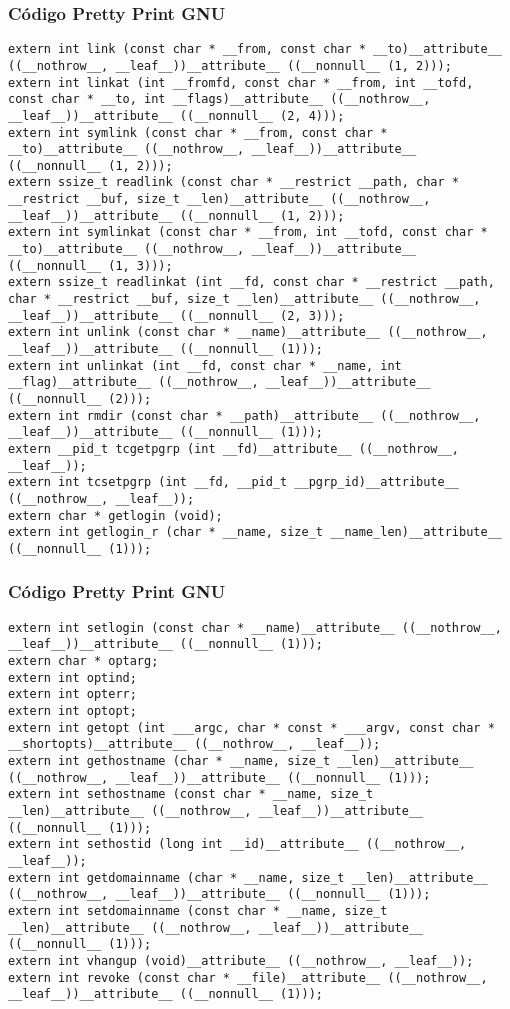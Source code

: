 \documentclass{beamer}
\begin{document}
\begin{frame}[fragile]
\frametitle{C\'odigo Pretty Print GNU}
\begin{verbatim}
extern int link (const char * __from, const char * __to)__attribute__ ((__nothrow__, __leaf__))__attribute__ ((__nonnull__ (1, 2)));
extern int linkat (int __fromfd, const char * __from, int __tofd, const char * __to, int __flags)__attribute__ ((__nothrow__, __leaf__))__attribute__ ((__nonnull__ (2, 4)));
extern int symlink (const char * __from, const char * __to)__attribute__ ((__nothrow__, __leaf__))__attribute__ ((__nonnull__ (1, 2)));
extern ssize_t readlink (const char * __restrict __path, char * __restrict __buf, size_t __len)__attribute__ ((__nothrow__, __leaf__))__attribute__ ((__nonnull__ (1, 2)));
extern int symlinkat (const char * __from, int __tofd, const char * __to)__attribute__ ((__nothrow__, __leaf__))__attribute__ ((__nonnull__ (1, 3)));
extern ssize_t readlinkat (int __fd, const char * __restrict __path, char * __restrict __buf, size_t __len)__attribute__ ((__nothrow__, __leaf__))__attribute__ ((__nonnull__ (2, 3)));
extern int unlink (const char * __name)__attribute__ ((__nothrow__, __leaf__))__attribute__ ((__nonnull__ (1)));
extern int unlinkat (int __fd, const char * __name, int __flag)__attribute__ ((__nothrow__, __leaf__))__attribute__ ((__nonnull__ (2)));
extern int rmdir (const char * __path)__attribute__ ((__nothrow__, __leaf__))__attribute__ ((__nonnull__ (1)));
extern __pid_t tcgetpgrp (int __fd)__attribute__ ((__nothrow__, __leaf__));
extern int tcsetpgrp (int __fd, __pid_t __pgrp_id)__attribute__ ((__nothrow__, __leaf__));
extern char * getlogin (void);
extern int getlogin_r (char * __name, size_t __name_len)__attribute__ ((__nonnull__ (1)));
\end{verbatim}
\end{frame}
\begin{frame}[fragile]
\frametitle{C\'odigo Pretty Print GNU}
\begin{verbatim}
extern int setlogin (const char * __name)__attribute__ ((__nothrow__, __leaf__))__attribute__ ((__nonnull__ (1)));
extern char * optarg;
extern int optind;
extern int opterr;
extern int optopt;
extern int getopt (int ___argc, char * const * ___argv, const char * __shortopts)__attribute__ ((__nothrow__, __leaf__));
extern int gethostname (char * __name, size_t __len)__attribute__ ((__nothrow__, __leaf__))__attribute__ ((__nonnull__ (1)));
extern int sethostname (const char * __name, size_t __len)__attribute__ ((__nothrow__, __leaf__))__attribute__ ((__nonnull__ (1)));
extern int sethostid (long int __id)__attribute__ ((__nothrow__, __leaf__));
extern int getdomainname (char * __name, size_t __len)__attribute__ ((__nothrow__, __leaf__))__attribute__ ((__nonnull__ (1)));
extern int setdomainname (const char * __name, size_t __len)__attribute__ ((__nothrow__, __leaf__))__attribute__ ((__nonnull__ (1)));
extern int vhangup (void)__attribute__ ((__nothrow__, __leaf__));
extern int revoke (const char * __file)__attribute__ ((__nothrow__, __leaf__))__attribute__ ((__nonnull__ (1)));
\end{verbatim}
\end{frame}
\end{document}
